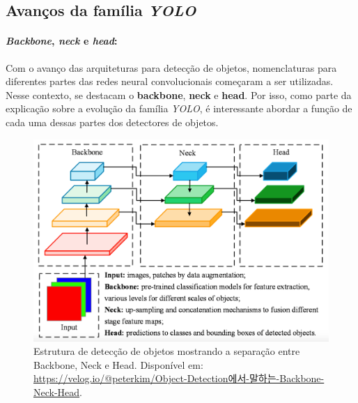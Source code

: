 \subsection{Avanços da família \emph{YOLO}}
\paragraph{\emph{Backbone}, \emph{neck} e \emph{head}:}
Com o avanço das arquiteturas para detecção de objetos, nomenclaturas para diferentes partes das redes neural convolucionais começaram a ser 
utilizadas. Nesse contexto, se destacam o {\bf backbone}, {\bf neck} e {\bf head}. Por isso, como parte da explicação sobre a evolução da família \emph{YOLO}, é interessante abordar a função de cada uma dessas partes dos detectores de objetos.

\begin{figure}[htb!]
    \centering
    \includegraphics[width=0.8\linewidth]{images/backbone-neck-head.png}
    \caption{\label{fig:backbone_neck_head} Estrutura de detecção de objetos mostrando a separação entre Backbone, Neck e Head. Disponível em: \url{https://velog.io/@peterkim/Object-Detection에서-말하는-Backbone-Neck-Head}.}
\end{figure}


